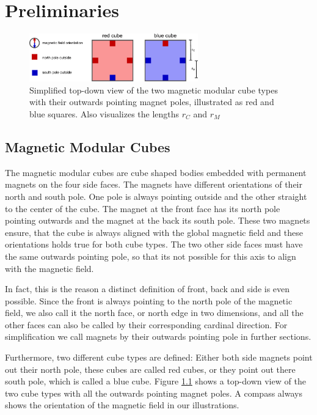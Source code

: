 \chapter{Preliminaries}

\begin{figure}
	\centering
	\includegraphics[width=0.65\textwidth]{figures/magnetic_cubes.pdf}
	\caption{Simplified top-down view of the two magnetic modular cube types with their outwards pointing magnet poles, illustrated as red and blue squares. Also visualizes the lengths $r_C$ and $r_M$}
	\label{fig:magnetic_cubes}
\end{figure}

\section{Magnetic Modular Cubes}
The magnetic modular cubes are cube shaped bodies embedded with permanent magnets on the four side faces.
The magnets have different orientations of their north and south pole. 
One pole is always pointing outside and the other straight to the center of the cube.
The magnet at the front face has its north pole pointing outwards and the magnet at the back its south pole.
These two magnets ensure, that the cube is always aligned with the global magnetic field and these orientations holds true for both cube types.
The two other side faces must have the same outwards pointing pole, so that its not possible for this axis to align with the magnetic field.

In fact, this is the reason a distinct definition of front, back and side is even possible.
Since the front is always pointing to the north pole of the magnetic field, we also call it the north face, or north edge in two dimensions, and all the other faces can also be called by their corresponding cardinal direction.
For simplification we call magnets by their outwards pointing pole in further sections.

Furthermore, two different cube types are defined:
Either both side magnets point out their north pole, these cubes are called red cubes, or they point out there south pole, which is called a blue cube.
Figure \ref{fig:magnetic_cubes} shows a top-down view of the two cube types with all the outwards pointing magnet poles.
A compass always shows the orientation of the magnetic field in our illustrations.

